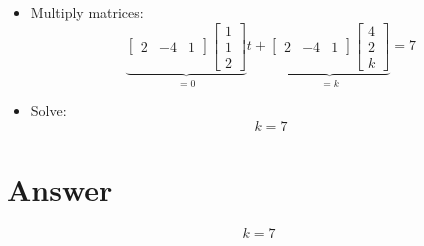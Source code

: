 \documentclass[12pt]{article}
\begin{document}
\begin{itemize}
\item Multiply matrices:
\[
\underbrace{\begin{bmatrix} 2 & -4 & 1 \end{bmatrix} \begin{bmatrix} 1\\1\\2 \end{bmatrix}}_{=0} t
+
\underbrace{\begin{bmatrix} 2 & -4 & 1 \end{bmatrix} \begin{bmatrix} 4\\2\\k \end{bmatrix}}_{=k} = 7
\]

\item Solve:
\[
k = 7
\]
\end{itemize}

\section*{Answer}
\[
\boxed{k = 7}
\]
\end{document}
